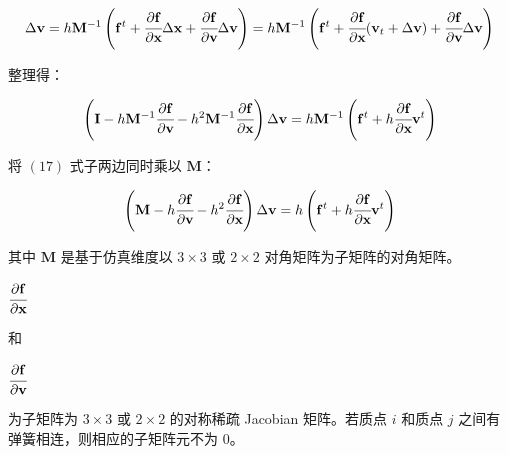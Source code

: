 \documentclass[UTF8]{ctexart}
\begin{document}
\begin{large}
\begin{equation}
\Delta \mathbf{v} = h \mathbf{M}^{-1} \left ( \mathbf{f}^{t} + \cfrac{\partial \mathbf{f}}{\partial \mathbf{x}} \Delta \mathbf{x} + \cfrac{\partial \mathbf{f}}{\partial \mathbf{v}} \Delta \mathbf{v}  \right ) = 
h \mathbf{M}^{-1} \left ( \mathbf{f}^{t} + \cfrac{\partial \mathbf{f}}{\partial \mathbf{x}} (\mathbf{v}_t + \Delta \mathbf{v}) + \cfrac{\partial \mathbf{f}}{\partial \mathbf{v}} \Delta \mathbf{v}  \right )
\end{equation}
\end{large}

整理得：

\begin{large}
\begin{equation}
\left ( \mathbf{I} - h \mathbf{M}^{-1} \cfrac{\partial \mathbf{f}}{\partial \mathbf{v}} - h^2 \mathbf{M}^{-1} \cfrac{\partial \mathbf{f}}{\partial \mathbf{x}} \right ) \Delta \mathbf{v} =
h  \mathbf{M}^{-1} \left ( \mathbf{f}^{t} + h \cfrac{\partial \mathbf{f}}{\partial \mathbf{x}} \mathbf{v}^t \right )
\end{equation}
\end{large}

将 $(17)$ 式子两边同时乘以 $\mathbf{M}$：

\begin{large}
\begin{equation}
\left ( \mathbf{M} - h \cfrac{\partial \mathbf{f}}{\partial \mathbf{v}} - h^2 \cfrac{\partial \mathbf{f}}{\partial \mathbf{x}} \right ) \Delta \mathbf{v} =
h \left ( \mathbf{f}^{t} + h \cfrac{\partial \mathbf{f}}{\partial \mathbf{x}} \mathbf{v}^t \right )
\end{equation}
\end{large}

其中 $\mathbf{M}$ 是基于仿真维度以 $3 \times 3$ 或 $2 \times 2$ 对角矩阵为子矩阵的对角矩阵。\begin{large}$\cfrac{\partial \mathbf{f}}{\partial \mathbf{x}}$ \end{large}和 \begin{large} $\cfrac{\partial \mathbf{f}}{\partial \mathbf{v}}$ \end{large}为子矩阵为 $3 \times 3$ 或 $2 \times 2$ 的对称稀疏 Jacobian 矩阵。若质点 $i$ 和质点 $j$ 之间有弹簧相连，则相应的子矩阵元不为 $0$。 \par
\end{document}
